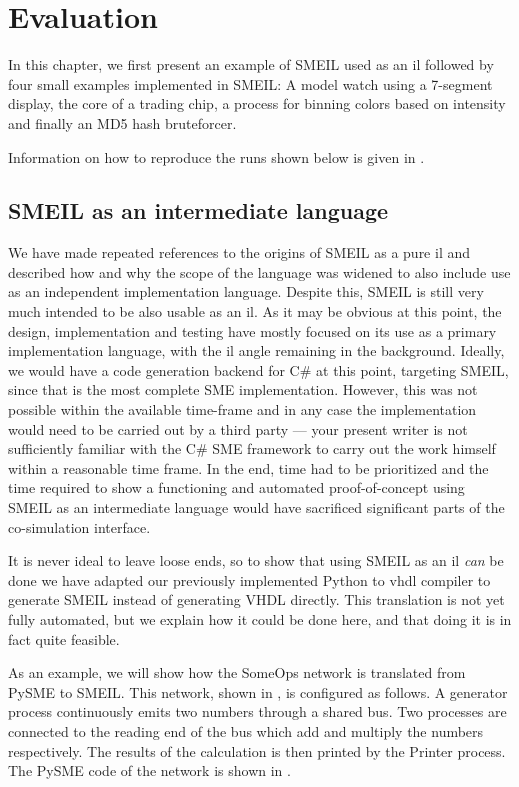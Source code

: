 \chapter{Evaluation}
\label{eval}

In this chapter, we first present an example of SMEIL used as an \gls{il}
followed by four small examples implemented in SMEIL: A model watch using a
7-segment display, the core of a trading chip, a process for binning colors
based on intensity and finally an MD5 hash bruteforcer.  

Information on how to reproduce the runs shown below is given in .


\section{SMEIL as an intermediate language}
\label{sec:smeilil}
We have made repeated references to the origins of SMEIL as a pure \gls{il} and
described how and why the scope of the language was widened to also include use
as an independent implementation language. Despite this, SMEIL is still very
much intended to be also usable as an \gls{il}. As it may be obvious at this
point, the design, implementation and testing have mostly focused on its use as
a primary implementation language, with the \gls{il} angle remaining in the
background. Ideally, we would have a code generation backend for C\# at this
point, targeting SMEIL, since that is the most complete SME
implementation. However, this was not possible within the available time-frame
and in any case the implementation would need to be carried out by a third party
--- your present writer is not sufficiently familiar with the C\# SME framework
to carry out the work himself within a reasonable time frame. In the end, time
had to be prioritized and the time required to show a functioning and automated
proof-of-concept using SMEIL as an intermediate language would have sacrificed
significant parts of the co-simulation interface.

It is never ideal to leave loose ends, so to show that using SMEIL as an
\gls{il} {\itshape can} be done we have adapted our previously implemented
Python to \gls{vhdl} compiler to generate SMEIL instead of generating VHDL
directly. This translation is not yet fully automated, but we explain how it
could be done here, and that doing it is in fact quite feasible.

As an example, we will show how the SomeOps network is translated from PySME to
SMEIL. This network, shown in , is configured as follows. A
generator process continuously emits two numbers through a shared bus. Two
processes are connected to the reading end of the bus which add and multiply the
numbers respectively. The results of the calculation is then printed by the
Printer process. The PySME code of the network is shown in .

